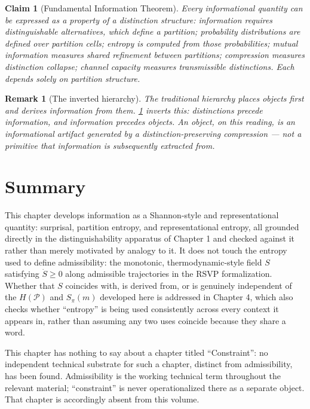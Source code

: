 \documentclass[12pt]{report}
\newtheorem{claim}[definition]{Claim}
\newtheorem{remark}[definition]{Remark}
\begin{document}
\begin{claim}[Fundamental Information Theorem]
\label{thm:fund-info}
Every informational quantity can be expressed as a property of a
distinction structure: information requires distinguishable alternatives,
which define a partition; probability distributions are defined over
partition cells; entropy is computed from those probabilities; mutual
information measures shared refinement between partitions; compression
measures distinction collapse; channel capacity measures transmissible
distinctions. Each depends solely on partition structure.
\end{claim}

\begin{remark}[The inverted hierarchy]
\label{rem:inverted}
The traditional hierarchy places objects first and derives information
from them. \cref{thm:fund-info} inverts this: distinctions precede
information, and information precedes objects. An object, on this
reading, is an informational artifact generated by a
distinction-preserving compression --- not a primitive that information
is subsequently extracted from.
\end{remark}

\section*{Summary}

This chapter develops information as a Shannon-style and representational
quantity: surprisal, partition entropy, and representational entropy,
all grounded directly in the distinguishability apparatus of Chapter 1
and checked against it rather than merely motivated by analogy to it. It
does not touch the entropy used to define admissibility: the monotonic,
thermodynamic-style field $S$ satisfying $\dot{S} \geq 0$ along admissible
trajectories in the RSVP formalization. Whether that $S$ coincides with,
is derived from, or is genuinely independent of the $H(\mathcal{P})$ and
$S_\pi(m)$ developed here is addressed in Chapter 4, which also checks
whether ``entropy'' is being used consistently across every context it
appears in, rather than assuming any two uses coincide because they
share a word.

This chapter has nothing to say about a chapter titled ``Constraint'':
no independent technical substrate for such a chapter, distinct from
admissibility, has been found. Admissibility is the working technical
term throughout the relevant material; ``constraint'' is never
operationalized there as a separate object. That chapter is accordingly
absent from this volume.
\end{document}
